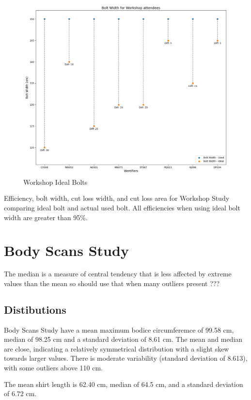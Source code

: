 \begin{figure} [H]
    \centering
    \includegraphics[width = \textwidth]{Images/Workshop_BoltWidths_Scatter.png}
    \caption{Workshop Ideal Bolts}
\end{figure}

Efficiency, bolt width, cut loss width, and cut loss area for Workshop Study comparing ideal bolt and actual used bolt. All efficiencies when using ideal bolt width are greater than 95\%.


\section{Body Scans Study}

The median is a measure of central tendency that is less affected by extreme values than the mean so should use that when many outliers present ???

\subsection{Distibutions}
Body Scans Study have a mean maximum bodice circumferemce of 99.58 cm, median of 98.25 cm and a standard deviation of 8.61 cm. The mean and median are close, indicating a relatively symmetrical distribution with a slight skew towards larger values. There is moderate variability (standard deviation of 8.613), with some outliers above 110 cm.

The mean shirt length is 62.40 cm, median of 64.5 cm, and a standard deviation of 6.72 cm. 

